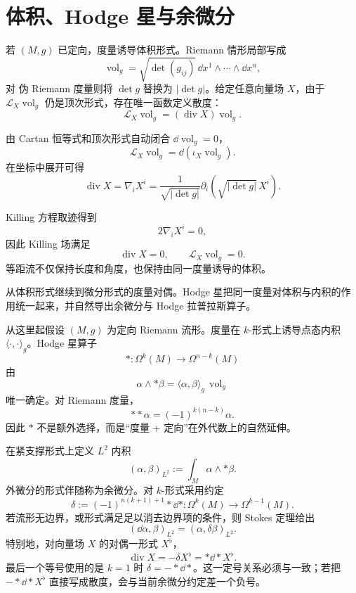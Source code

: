 \section{体积、Hodge 星与余微分}

若 $(M,g)$ 已定向，度量诱导体积形式。Riemann 情形局部写成
\begin{equation*}\operatorname{vol}_g
=\sqrt{\det(g_{ij})}\,
\dd x^1\wedge\cdots\wedge\dd x^n,
\end{equation*}
对 伪 Riemann 度量则将 $\det g$ 替换为 $|\det g|$。给定任意向量场 $X$，由于 $\mathcal L_X\operatorname{vol}_g$ 仍是顶次形式，存在唯一函数定义散度：
\begin{equation}\label{eq:math-dg-divergence-volume}
\mathcal L_X\operatorname{vol}_g=(\operatorname{div} X)\operatorname{vol}_g.
\end{equation}

由 Cartan 恒等式和顶次形式自动闭合 $\dd\operatorname{vol}_g=0$，
\[
\mathcal L_X\operatorname{vol}_g=\dd(\iota_{X}\operatorname{vol}_g).
\]
在坐标中展开可得
\begin{equation*}{
\operatorname{div} X
=\nabla_iX^i
=\frac{1}{\sqrt{|\det g|}}
\partial_i\!\left(\sqrt{|\det g|}\,X^i\right).}
\end{equation*}

Killing 方程取迹得到
\[
2\nabla_iX^i=0,
\]
因此 Killing 场满足
\begin{equation*}\operatorname{div} X=0,
\qquad
\mathcal L_X\operatorname{vol}_g=0.
\end{equation*}
等距流不仅保持长度和角度，也保持由同一度量诱导的体积。

从体积形式继续到微分形式的度量对偶。Hodge 星把同一度量对体积与内积的作用统一起来，并自然导出余微分与 Hodge 拉普拉斯算子。

从这里起假设 $(M,g)$ 为定向 Riemann 流形。度量在 $k$-形式上诱导点态内积 $\langle\cdot,\cdot\rangle_g$。Hodge 星算子
\begin{equation*}*:\Omega^k(M)\to\Omega^{n-k}(M)
\end{equation*}
由
\begin{equation}\label{eq:math-dg-hodge-star-characterization}
\alpha\wedge *\beta
=\langle\alpha,\beta\rangle_g\,\operatorname{vol}_g
\end{equation}
唯一确定。对 Riemann 度量，
\[
**\alpha=(-1)^{k(n-k)}\alpha.
\]
因此 $*$ 不是额外选择，而是“度量 + 定向”在外代数上的自然延伸。

在紧支撑形式上定义 $L^2$ 内积
\[
(\alpha,\beta)_{L^2}
:=\int_M\alpha\wedge *\beta.
\]
外微分的形式伴随称为余微分。对 $k$-形式采用约定
\begin{equation*}\delta
:=(-1)^{n(k+1)+1}*\dd*:
\Omega^k(M)\to\Omega^{k-1}(M).
\end{equation*}
若流形无边界，或形式满足足以消去边界项的条件，则 Stokes 定理给出
\[
(\dd\alpha,\beta)_{L^2}
=(\alpha,\delta\beta)_{L^2}.
\]
特别地，对向量场 $X$ 的对偶一形式 $X^\flat$，
\begin{equation*}{\operatorname{div} X=-\delta X^\flat=*\dd*X^\flat.}
\end{equation*}
最后一个等号使用的是 $k=1$ 时 $\delta=-*\dd*$。这一定号关系必须与一致；若把 $-*\dd*X^\flat$ 直接写成散度，会与当前余微分约定差一个负号。


